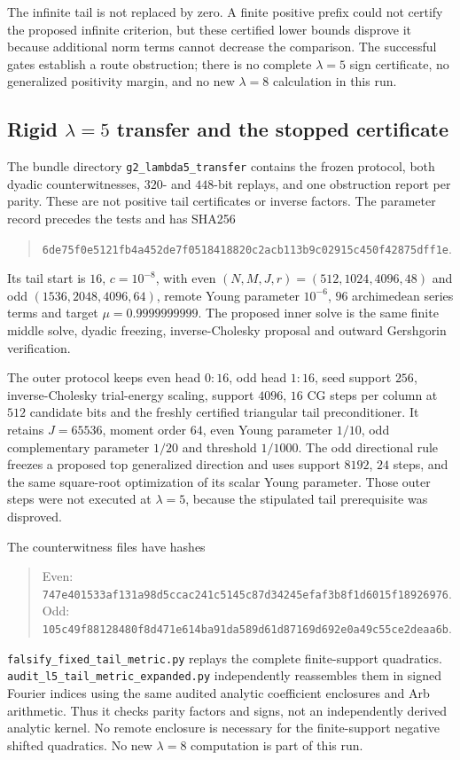 \documentclass[11pt]{article}
\theoremstyle{remark}
\begin{document}
The infinite tail is not replaced by zero. A finite positive prefix
could not certify the proposed infinite criterion, but these certified
lower bounds disprove it because additional norm terms cannot decrease
the comparison. The successful gates establish a route obstruction;
there is no complete $\lambda=5$ sign certificate, no generalized
positivity margin, and no new $\lambda=8$ calculation in this run.

\subsection*{Rigid $\lambda=5$ transfer and the stopped certificate}
\label{app:v127-transfer}
The bundle directory \texttt{g2\_lambda5\_transfer} contains the frozen
protocol, both dyadic counterwitnesses, $320$- and $448$-bit replays,
and one obstruction report per parity. These are not positive tail
certificates or inverse factors. The parameter record precedes the
tests and has SHA256
\begin{quote}\small\nolinkurl{6de75f0e5121fb4a452de7f0518418820c2acb113b9c02915c450f42875dff1e}.\end{quote}
Its tail start is $16$, $c=10^{-8}$, with even $(N,M,J,r)=(512,1024,4096,48)$
and odd $(1536,2048,4096,64)$, remote Young parameter $10^{-6}$,
$96$ archimedean series terms and target $\mu=0.9999999999$.
The proposed inner solve is the same finite middle solve, dyadic
freezing, inverse-Cholesky proposal and outward Gershgorin verification.

The outer protocol keeps even head $0{:}16$, odd head $1{:}16$, seed
support $256$, inverse-Cholesky trial-energy scaling, support $4096$,
$16$ CG steps per column at $512$ candidate bits and the freshly
certified triangular tail preconditioner. It retains $J=65536$, moment
order $64$, even Young parameter $1/10$, odd complementary parameter
$1/20$ and threshold $1/1000$. The odd directional rule freezes a
proposed top generalized direction and uses support $8192$, $24$ steps,
and the same square-root optimization of its scalar Young parameter.
Those outer steps were not executed at $\lambda=5$, because the
stipulated tail prerequisite was disproved.

The counterwitness files have hashes
\begin{quote}\small
Even: \nolinkurl{747e401533af131a98d5ccac241c5145c87d34245efaf3b8f1d6015f18926976}.\\
Odd: \nolinkurl{105c49f88128480f8d471e614ba91da589d61d87169d692e0a49c55ce2deaa6b}.
\end{quote}
\nolinkurl{falsify_fixed_tail_metric.py} replays the complete finite-support
quadratics. \nolinkurl{audit_l5_tail_metric_expanded.py} independently
reassembles them in signed Fourier indices using the same audited
analytic coefficient enclosures and Arb arithmetic. Thus it checks
parity factors and signs, not an independently derived analytic kernel.
No remote enclosure is necessary for the finite-support negative
shifted quadratics. No new $\lambda=8$ computation is part of this run.
\end{document}
